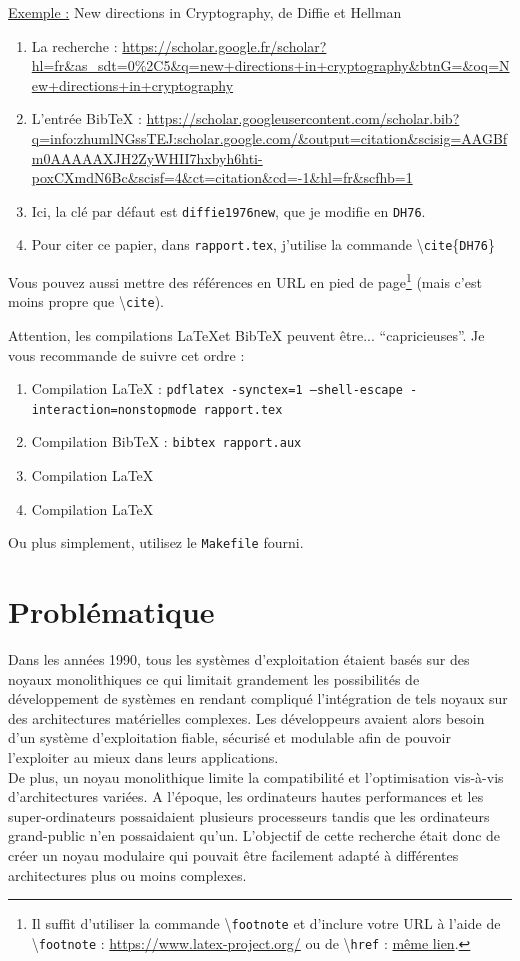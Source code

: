 \documentclass[a4paper, 12pt]{article}
\begin{document}
\underline{Exemple :} New directions in Cryptography, de Diffie et Hellman

\begin{enumerate}
\item La recherche : \url{https://scholar.google.fr/scholar?hl=fr&as_sdt=0%2C5&q=new+directions+in+cryptography&btnG=&oq=New+directions+in+cryptography}
\item L'entrée BibTeX : \url{https://scholar.googleusercontent.com/scholar.bib?q=info:zhumlNGssTEJ:scholar.google.com/&output=citation&scisig=AAGBfm0AAAAAXJH2ZyWHII7hxbyh6hti-poxCXmdN6Bc&scisf=4&ct=citation&cd=-1&hl=fr&scfhb=1}
\item Ici, la clé par défaut est \texttt{diffie1976new}, que je modifie en \texttt{DH76}. 
\item Pour citer ce papier, dans \texttt{rapport.tex}, j'utilise la commande \textbackslash\texttt{cite}\{\texttt{DH76}\}
\end{enumerate}



Vous pouvez aussi mettre des références en URL en pied de page\footnote{Il suffit d'utiliser la commande \textbackslash\texttt{footnote} et d'inclure votre URL à l'aide de \textbackslash\texttt{footnote} : \url{https://www.latex-project.org/} ou de \textbackslash\texttt{href} : \href{https://www.latex-project.org/}{même lien}.} (mais c'est moins propre que \textbackslash\texttt{cite}).
 

Attention, les compilations \LaTeX et BibTeX peuvent être... ``capricieuses''. Je vous recommande de suivre cet ordre :
\begin{enumerate}
\item Compilation \LaTeX{} : \texttt{pdflatex -synctex=1 --shell-escape -interaction=nonstopmode rapport.tex}
\item Compilation BibTeX : \texttt{bibtex rapport.aux}
\item Compilation \LaTeX{}
\item Compilation \LaTeX{}
\end{enumerate}
Ou plus simplement, utilisez le \texttt{Makefile} fourni.

\clearpage 
\section{Problématique}

Dans les années 1990, tous les systèmes d'exploitation étaient basés sur des noyaux monolithiques ce qui limitait grandement les possibilités de développement de systèmes en rendant compliqué l'intégration de tels noyaux sur des architectures matérielles complexes. Les développeurs avaient alors besoin d'un système d'exploitation fiable, sécurisé et modulable afin de pouvoir l'exploiter au mieux dans leurs applications. \\
De plus, un noyau monolithique limite la compatibilité et l'optimisation vis-à-vis d'architectures variées. A l'époque, les ordinateurs hautes performances et les super-ordinateurs possaidaient plusieurs processeurs tandis que les ordinateurs grand-public n'en possaidaient qu'un. L'objectif de cette recherche était donc de créer un noyau modulaire qui pouvait être facilement adapté à différentes architectures plus ou moins complexes.
\end{document}
